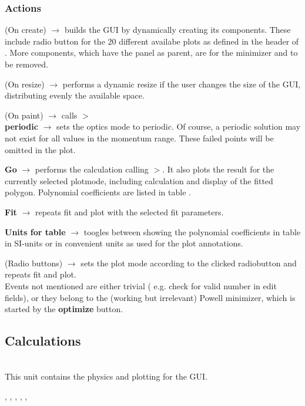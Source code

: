 \documentclass[12pt]{article}
\newcommand\code[1]{{\tt #1}}
\newcommand{\ofld}[1]{\colorbox{black!15}{{\bf #1}}}
\newcommand{\ofldx}[1]{\colorbox{black!15}{(#1)}}
\newcommand\guico[1]{{\color{blue}\code{#1}}}
\newcommand{\unico}[1]{{\color{burntorange}\code{#1}}}
\newcommand{\evcod}[2]{\ofld{#1} $\rightarrow$ \guico{#2}}
\newcommand{\evcodx}[2]{\ofldx{#1} $\rightarrow$ \guico{#2}}
\newcommand{\prcod}[2]{\opauni{#1}$>$\unico{#2}}
\newcommand{\opagui}[1]{\colorbox{blue!20}{{\color{black}\code{#1}}}}
\newcommand{\ogui}[1]{\hyperref[#1]{\opagui{#1}}}
\newcommand{\opaguif}[1]{\colorbox{violet!30}{{\color{black}\code{#1}}}}
\newcommand{\oguif}[1]{\hyperref[#1]{\opaguif{#1}}}
\newcommand{\opauni}[1]{\colorbox{orange!30}{{\color{black}\code{#1}}}}
\newcommand{\ounih}[2]{\subsection{\label{#2}#1}{\Huge\opauni{#2}}\\}
\newcommand{\ouni}[1]{\hyperref[#1]{\opauni{#1}}}
\newcommand{\uses}[1]{\flushleft {\bf Uses:} #1}
\newcommand{\desc}[1]{#1}
\newcommand{\act}[1]{\subsubsection*{Actions} #1}
\newcommand{\todo}[1]{{\color{red} #1}}
\begin{document}
\act{
\evcodx{On create}{FormCreate} builds the GUI by dynamically creating its components. These include radio button for the 20 different availabe plots as defined in the header of \ouni{momentumlib}. \todo{More components, which have the \guico{panmin} panel as parent, are for the minimizer and to be removed.}

\evcodx{On resize}{FormResize} performs a dynamic resize if the user changes the size of the GUI, distributing evenly the available space.

\evcodx{On paint}{FormPaint} calls \prcod{momentumlib}{MakePlot}\\

\evcod{periodic}{chkPerClick} sets the optics mode to periodic. Of course, a periodic solution may not exist for all values in the momentum range. These failed points will be omitted in the plot.

\evcod{Go}{butGoClick} performs the calculation calling \prcod{momentumlib}{FullCalc}. It also plots the result for the currently selected plotmode, including calculation and display of the fitted polygon. Polynomial coefficients are listed in table \guico{gfit}.

\evcod{Fit}{butFitClick} repeats fit and plot with the selected fit parameters.

\evcod{Units for table}{butfunitClick} toogles between showing the polynomial coefficients in table \guico{gfit} in SI-units or in convenient units as used for the plot annotations.

\evcodx{Radio buttons}{rbClick} sets the plot mode according to the clicked radiobutton and repeats fit and plot. \\

Events not mentioned are either trivial ( e.g. check for valid number in edit fields), or they belong to the (working but irrelevant) Powell minimizer, which is started by the \ofld{optimize} button. 
}


\ounih{Calculations}{momentumlib} 

\desc{This unit contains the physics and plotting for the \ogui{opamomentum} GUI.
}

\uses{\ouni{linoplib}, \ogui{opatunediag}, \ouni{globlib}, \ouni{mathlib}, \oguif{../com/asfigure}, \ouni{../com/asaux}} 
\end{document}
